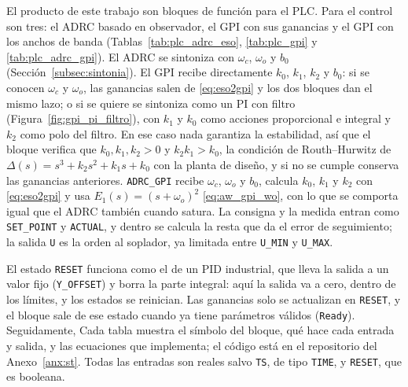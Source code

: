 El producto de este trabajo son bloques de función para el PLC. Para el control
son tres: el ADRC basado en observador, el GPI con sus ganancias y el GPI con
los anchos de banda (Tablas~\ref{tab:plc_adrc_eso}, \ref{tab:plc_gpi} y \ref{tab:plc_adrc_gpi}). El
ADRC se sintoniza con $\omega_c$, $\omega_o$ y $b_0$
(Sección~\ref{subsec:sintonia}). El GPI recibe directamente $k_0$, $k_1$, $k_2$
y $b_0$: si se conocen $\omega_c$ y $\omega_o$, las ganancias salen de
\eqref{eq:eso2gpi} y los dos bloques dan el mismo lazo; o si se quiere se sintoniza
como un PI con filtro (Figura~\ref{fig:gpi_pi_filtro}), con $k_1$ y $k_0$ como
acciones proporcional e integral y $k_2$ como polo del filtro. En ese caso nada
garantiza la estabilidad, así que el bloque verifica que $k_0, k_1, k_2 > 0$ y
$k_2 k_1 > k_0$, la condición de Routh--Hurwitz de
$\Delta(s) = s^3 + k_2 s^2 + k_1 s + k_0$ con la planta de diseño, y si no se
cumple conserva las ganancias anteriores. \texttt{ADRC\_GPI} recibe $\omega_c$, $\omega_o$
y $b_0$, calcula $k_0$, $k_1$ y $k_2$ con \eqref{eq:eso2gpi} y usa
$E_1(s) = (s + \omega_o)^2$ \eqref{eq:aw_gpi_wo}, con lo que se comporta igual que el
ADRC también cuando satura. La
consigna y la medida
entran como \texttt{SET\_POINT} y \texttt{ACTUAL}, y dentro se calcula la resta que da el error de
seguimiento; la salida \texttt{U} es la orden al soplador, ya limitada entre \texttt{U\_MIN} y
\texttt{U\_MAX}.

El estado \texttt{RESET} funciona como el de un PID industrial, que lleva la salida a un valor fijo
(\texttt{Y\_OFFSET}) y borra la parte integral: aquí la salida va a cero, dentro de los límites, y los estados se reinician. Las
ganancias solo se actualizan en \texttt{RESET}, y el bloque sale de ese estado cuando ya tiene
parámetros válidos (\texttt{Ready}). Seguidamente, Cada tabla muestra el símbolo del bloque, qué hace cada entrada
y salida, y las ecuaciones que implementa; el código está en el repositorio del Anexo~\ref{anx:st}. Todas las entradas
son reales salvo \texttt{TS}, de tipo \texttt{TIME}, y \texttt{RESET}, que es booleana.

\newcommand{\bloqueplc}[5]{%
  \begin{scope}[xshift=#1 cm]
    \draw (0,0) rectangle (3.2,#3);
    \node[font=\ttfamily] at (1.6,-0.35) {#2};
    \draw[thin] (0,-0.7) -- (3.2,-0.7);
    \foreach \i/\pin/\sen in {#4} {
      \draw[->] (-0.6,-0.6-0.55*\i) node[left] {\sen} -- (0,-0.6-0.55*\i);
      \node[right, font=\ttfamily\footnotesize] at (0,-0.6-0.55*\i) {\pin};
    }
    \foreach \i/\pin/\sen in {#5} {
      \draw[->] (3.2,-0.6-0.55*\i) -- (3.8,-0.6-0.55*\i) node[right] {\sen};
      \node[left, font=\ttfamily\footnotesize] at (3.2,-0.6-0.55*\i) {\pin};
    }
  \end{scope}%
}

